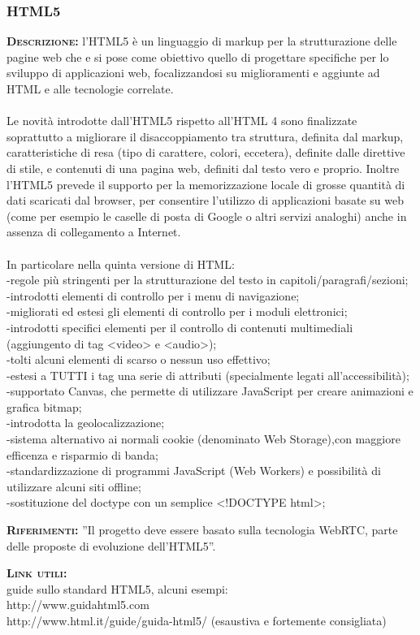 \subsubsection{HTML5}
\begin{description}
	\item{\scshape\bfseries Descrizione:} l'HTML5 è un linguaggio di markup per la strutturazione delle pagine web che e si pose come obiettivo quello di progettare specifiche per lo sviluppo di applicazioni web, focalizzandosi su miglioramenti e aggiunte ad HTML e alle tecnologie correlate.\\\\
Le novità introdotte dall'HTML5 rispetto all'HTML 4 sono finalizzate soprattutto a migliorare il disaccoppiamento tra struttura, definita dal markup, caratteristiche di resa (tipo di carattere, colori, eccetera), definite dalle direttive di stile, e contenuti di una pagina web, definiti dal testo vero e proprio. Inoltre l'HTML5 prevede il supporto per la memorizzazione locale di grosse quantità di dati scaricati dal browser, per consentire l'utilizzo di applicazioni basate su web (come per esempio le caselle di posta di Google o altri servizi analoghi) anche in assenza di collegamento a Internet.\\\\
In particolare nella quinta versione di HTML:\\
-regole più stringenti per la strutturazione del testo in capitoli/paragrafi/sezioni;\\
-introdotti elementi di controllo per i menu di navigazione;\\
-migliorati ed estesi gli elementi di controllo per i moduli elettronici;\\
-introdotti specifici elementi per il controllo di contenuti multimediali (aggiungento di tag <video> e <audio>);\\
-tolti alcuni elementi di scarso o nessun uso effettivo;\\
-estesi a TUTTI i tag una serie di attributi (specialmente legati all'accessibilità);\\
-supportato Canvas, che permette di utilizzare JavaScript per creare animazioni e grafica bitmap;\\
-introdotta la geolocalizzazione;\\
-sistema alternativo ai normali cookie (denominato Web Storage),con maggiore efficenza e risparmio di banda;\\
-standardizzazione di programmi JavaScript (Web Workers) e possibilità di utilizzare alcuni siti offline;\\
-sostituzione del doctype con un semplice <!DOCTYPE html>;
	\item{\scshape\bfseries Riferimenti:} ''Il progetto deve essere basato sulla tecnologia WebRTC, parte delle proposte di evoluzione dell'HTML5''.
	\item{\scshape\bfseries Link utili:} \\guide sullo standard HTML5, alcuni esempi:\\
http://www.guidahtml5.com\\
http://www.html.it/guide/guida-html5/ (esaustiva e fortemente consigliata)
\end{description}

